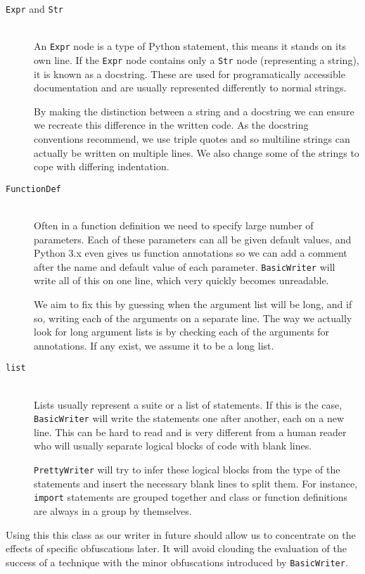 \documentclass{report}
\begin{document}
\begin{description}
\item[\texttt{Expr} and \texttt{Str}] \hfill \\
An \texttt{Expr} node is a type of Python statement, this means it stands on its own line. If the \texttt{Expr} node contains only a \texttt{Str} node
(representing a string), it is known as a docstring. These are used for programatically accessible documentation and are usually represented
differently to normal strings.

By making the distinction between a string and a docstring we can ensure we recreate this difference in the written code. As the docstring conventions 
\cite{docstr} recommend, we use triple quotes and so multiline strings can actually be written on multiple lines. We also change some of the strings to
cope with differing indentation.

\item[\texttt{FunctionDef}] \hfill \\
Often in a function definition we need to specify large number of parameters. Each of these parameters can all be given default values, and Python 3.x
even gives us function annotations so we can add a comment after the name and default value of each parameter. \texttt{BasicWriter} will write all
of this on one line, which very quickly becomes unreadable.

We aim to fix this by guessing when the argument list will be long, and if so, writing each of the arguments on a separate line. The way we actually look
for long argument lists is by checking each of the arguments for annotations. If any exist, we assume it to be a long list.

\item[\texttt{list}] \hfill \\
Lists usually represent a suite or a list of statements. If this is the case, \texttt{BasicWriter} will write the statements one after another, each on a
new line. This can be hard to read and is very different from a human reader who will usually separate logical blocks of code with blank lines.

\texttt{PrettyWriter} will try to infer these logical blocks from the type of the statements and insert the necessary blank lines to split them. For instance,
\texttt{import} statements are grouped together and class or function definitions are always in a group by themselves.
\end{description}

Using this this class as our writer in future should allow us to concentrate on the effects of specific obfuscations later. It will avoid clouding the evaluation
of the success of a technique with the minor obfuscations introduced by \texttt{BasicWriter}.
\end{document}
